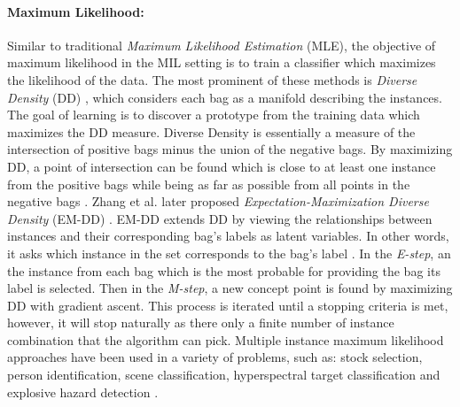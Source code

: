 \paragraph{Maximum Likelihood:}
Similar to traditional \textit{Maximum Likelihood Estimation} (MLE), the objective of maximum likelihood in the MIL setting is to train a classifier which maximizes the likelihood of the data.  The most prominent of these methods is \textit{Diverse Density} (DD) \citep{Maron1998DiverseDensity}, which considers each bag as a manifold describing the instances.  The goal of learning is to discover a prototype  from the training data which maximizes the DD measure.  Diverse Density is essentially a measure of the intersection of positive bags minus the union of the negative bags.  By maximizing DD, a point of intersection can be found which is close to at least one instance  from the positive bags while being as far as possible from all points in the negative bags \citep{Ghaffarzadegan2018MILVAE}.   Zhang et al. later proposed \textit{Expectation-Maximization Diverse Density} (EM-DD) \citep{Zhang2002EMDD}. EM-DD extends DD by viewing the relationships between instances and their corresponding bag's labels as latent variables.  In other words, it asks which instance in the set corresponds to the bag's label \citep{Du2017Thesis}. In the \textit{E-step}, an the instance from each bag which is the most probable for providing the bag its label is selected.  Then in the \textit{M-step}, a new concept point is found by maximizing DD with gradient ascent.  This process is iterated until a stopping criteria is met, however, it will stop naturally as there only a finite number of instance combination that the algorithm can pick.  Multiple instance maximum likelihood approaches have been used in a variety of problems, such as: stock selection, person identification, scene classification, hyperspectral target classification and explosive hazard detection \citep{Maron1998DiverseDensity, Maron1998MILSceneClassification, Zare2016MIACE, Zare2015MILLandmineEMI, Bocinsky2019SPIEMIACEInitialization, Mccurley2019SPIEWEMIComparison}.    

